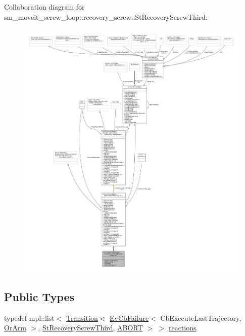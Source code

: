 Collaboration diagram for sm\+\_\+moveit\+\_\+screw\+\_\+loop\+:\+:recovery\+\_\+screw\+:\+:St\+Recovery\+Screw\+Third\+:
\nopagebreak
\begin{figure}[H]
\begin{center}
\leavevmode
\includegraphics[width=350pt]{structsm__moveit__screw__loop_1_1recovery__screw_1_1StRecoveryScrewThird__coll__graph}
\end{center}
\end{figure}
\subsection*{Public Types}
\begin{DoxyCompactItemize}
\item 
typedef mpl\+::list$<$ \hyperlink{classsmacc_1_1Transition}{Transition}$<$ \hyperlink{structsmacc_1_1EvCbFailure}{Ev\+Cb\+Failure}$<$ Cb\+Execute\+Last\+Trajectory, \hyperlink{classsm__moveit__screw__loop_1_1OrArm}{Or\+Arm} $>$, \hyperlink{structsm__moveit__screw__loop_1_1recovery__screw_1_1StRecoveryScrewThird}{St\+Recovery\+Screw\+Third}, \hyperlink{structsmacc_1_1default__transition__tags_1_1ABORT}{A\+B\+O\+RT} $>$ $>$ \hyperlink{structsm__moveit__screw__loop_1_1recovery__screw_1_1StRecoveryScrewThird_a111d5d6a4eb3308a76a0dbc0eb9d0629}{reactions}
\end{DoxyCompactItemize}
